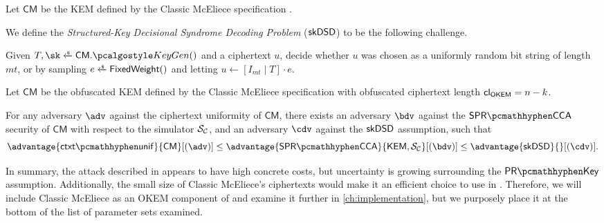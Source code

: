 \begin{definition}
\label{def:classic-mceliece-alt-assump}
    Let $\mathsf{CM}$ be the KEM defined by the Classic McEliece specification \cite{NISTPQC-R4:ClassicMcEliece22}.

    We define the  \emph{Structured-Key Decisional Syndrome Decoding Problem} ($\mathsf{skDSD}$) to be the following challenge.
    
    Given $T, \sk \getsr \mathsf{CM}.\kgen()$ and a ciphertext $u$, decide whether $u$ was chosen as a uniformly random bit string of length $mt$, or by sampling $e \getsr \mathsf{FixedWeight}()$ and letting $u \gets \left[ I_{mt} \mid T \right] \cdot e$.
\end{definition}

\begin{conjecture}
\label{conj:classic-mceliece-ctxt-unif-skdsd}
    Let $\mathsf{CM}$ be the obfuscated KEM defined by the Classic McEliece specification \cite{NISTPQC-R4:ClassicMcEliece22} with obfuscated ciphertext length ${\mathsf{cl}_{\mathsf{OKEM}}} = n-k$.

    For any adversary $\adv$ against the ciphertext uniformity of $\mathsf{CM}$, there exists an adversary $\bdv$ against the $\sprcca$ security of $\mathsf{CM}$ with respect to the simulator $\mathcal{S}_\mathcal{C}$, and an adversary $\cdv$ against the $\mathsf{skDSD}$ assumption, such that
    \[
        \advantage{\ctxtunif}{\mathsf{CM}}[(\adv)]
        \leq \advantage{\sprcca}{\KEM,\simulunif}[(\bdv)]
        \leq \advantage{\skdsd}{}[(\cdv)].
    \]
\end{conjecture}

In summary, the attack described in \cite{cryptoeprint:2024/1193} appears to have high concrete costs, but uncertainty is growing surrounding the $\prkey$ assumption. Additionally, the small size of Classic McEliece's ciphertexts would make it an efficient choice to use in \drivel{}.
Therefore, we will include Classic McEliece as an OKEM component of \drivel{} and examine it further in \cref{ch:implementation}, but we purposely place it at the bottom of the list of parameter sets examined.
